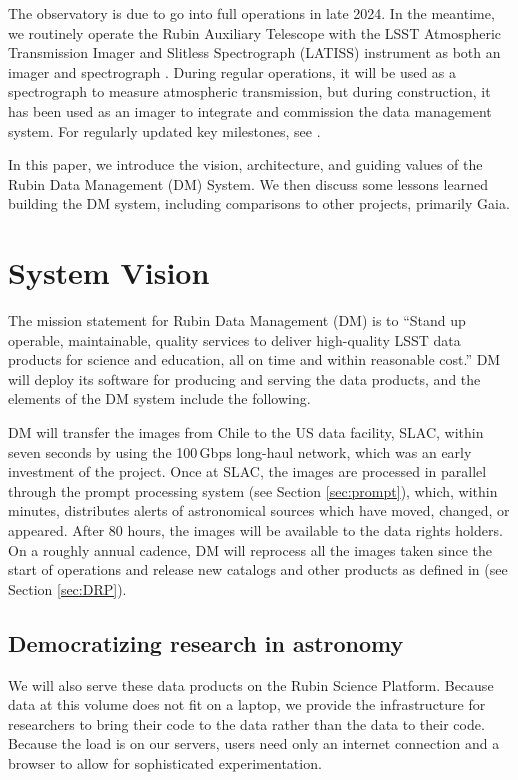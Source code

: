 \documentclass[11pt,twoside]{article}
\begin{document}
The observatory is due to go into full operations in late 2024.
In the meantime, we routinely operate the Rubin Auxiliary Telescope with the LSST Atmospheric Transmission Imager and Slitless Spectrograph (LATISS) instrument as both an imager and spectrograph \citep{2020SPIE11452E..0UI}.
During regular operations, it will be used as a spectrograph to measure atmospheric transmission, but during construction, it has been used as an imager to integrate and commission the data management system.
For regularly updated key milestones, see \citet{DMTN-232}.

In this paper, we introduce the vision, architecture, and guiding values of the Rubin Data Management (DM) System. We then discuss some lessons learned building the DM system, including comparisons to other projects, primarily Gaia.


\section{System Vision}

The mission statement for Rubin Data Management (DM) is to ``Stand up operable, maintainable, quality services to deliver high-quality LSST data products for science and education, all on time and within reasonable cost.'' DM will deploy its software for producing and serving the data products, and the elements of the DM system include the following.

DM will transfer the images from Chile to the US data facility, SLAC, within seven seconds by using the 100\,Gbps long-haul network, which was an early investment of the project.
Once at SLAC, the images are processed in parallel through the prompt processing system (see Section \ref{sec:prompt}), which, within minutes, distributes alerts of astronomical sources which have moved, changed, or appeared.
After 80 hours, the images will be available to the data rights holders.
On a roughly annual cadence, DM will reprocess all the images taken since the start of operations and release new catalogs and other products as defined in \citet{LSE-163} (see Section \ref{sec:DRP}).


\subsection{Democratizing research in astronomy}

We will also serve these data products on the Rubin Science Platform.
Because data at this volume does not fit on a laptop, we provide the infrastructure for researchers to bring their code to the data rather than the data to their code.
Because the load is on our servers, users need only an internet connection and a browser to allow for sophisticated experimentation.
\end{document}
